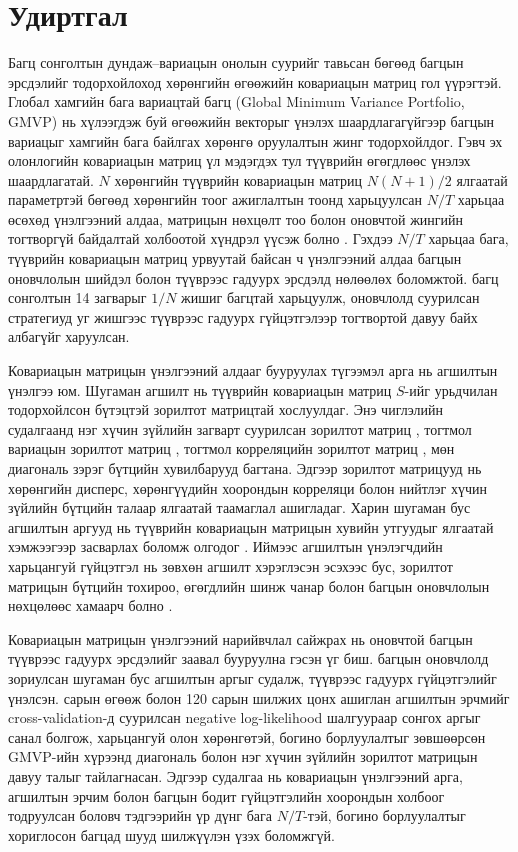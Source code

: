 \section{Удиртгал}
\label{sec:introduction}

Багц сонголтын дундаж--вариацын онолын суурийг \citet{markowitz1952} тавьсан бөгөөд багцын эрсдэлийг тодорхойлоход хөрөнгийн өгөөжийн ковариацын матриц гол үүрэгтэй. Глобал хамгийн бага вариацтай багц (Global Minimum Variance Portfolio, GMVP) нь хүлээгдэж буй өгөөжийн векторыг үнэлэх шаардлагагүйгээр багцын вариацыг хамгийн бага байлгах хөрөнгө оруулалтын жинг тодорхойлдог. Гэвч эх олонлогийн ковариацын матриц үл мэдэгдэх тул түүврийн өгөгдлөөс үнэлэх шаардлагатай. $N$ хөрөнгийн түүврийн ковариацын матриц $N(N+1)/2$ ялгаатай параметртэй бөгөөд хөрөнгийн тоог ажиглалтын тоонд харьцуулсан $N/T$ харьцаа өсөхөд үнэлгээний алдаа, матрицын нөхцөлт тоо болон оновчтой жингийн тогтворгүй байдалтай холбоотой хүндрэл үүсэж болно \citep{ledoitwolf2004a}. Гэхдээ $N/T$ харьцаа бага, түүврийн ковариацын матриц урвуутай байсан ч үнэлгээний алдаа багцын оновчлолын шийдэл болон түүврээс гадуурх эрсдэлд нөлөөлөх боломжтой. \citet{demiguel2009} багц сонголтын 14 загварыг $1/N$ жишиг багцтай харьцуулж, оновчлолд суурилсан стратегиуд уг жишгээс түүврээс гадуурх гүйцэтгэлээр тогтвортой давуу байх албагүйг харуулсан.

Ковариацын матрицын үнэлгээний алдааг бууруулах түгээмэл арга нь агшилтын үнэлгээ юм. Шугаман агшилт нь түүврийн ковариацын матриц $S$-ийг урьдчилан тодорхойлсон бүтэцтэй зорилтот матрицтай хослуулдаг. Энэ чиглэлийн судалгаанд нэг хүчин зүйлийн загварт суурилсан зорилтот матриц \citep{ledoitwolf2003}, тогтмол вариацын зорилтот матриц \citep{ledoitwolf2004a}, тогтмол корреляцийн зорилтот матриц \citep{ledoitwolf2004b}, мөн диагональ зэрэг бүтцийн хувилбарууд \citep{SchaferStrimmer2005,AndoXiao2023} багтана. Эдгээр зорилтот матрицууд нь хөрөнгийн дисперс, хөрөнгүүдийн хоорондын корреляци болон нийтлэг хүчин зүйлийн бүтцийн талаар ялгаатай таамаглал ашигладаг. Харин шугаман бус агшилтын аргууд нь түүврийн ковариацын матрицын хувийн утгуудыг ялгаатай хэмжээгээр засварлах боломж олгодог \citep{ledoitwolf2012,ledoitwolf2020}. Иймээс агшилтын үнэлэгчдийн харьцангуй гүйцэтгэл нь зөвхөн агшилт хэрэглэсэн эсэхээс бус, зорилтот матрицын бүтцийн тохироо, өгөгдлийн шинж чанар болон багцын оновчлолын нөхцөлөөс хамаарч болно \citep{ledoitwolf2022}.

Ковариацын матрицын үнэлгээний нарийвчлал сайжрах нь оновчтой багцын түүврээс гадуурх эрсдэлийг заавал бууруулна гэсэн үг биш. \citet{ledoitwolf2017} багцын оновчлолд зориулсан шугаман бус агшилтын аргыг судалж, түүврээс гадуурх гүйцэтгэлийг үнэлсэн. \citet{shi2025} сарын өгөөж болон 120 сарын шилжих цонх ашиглан агшилтын эрчмийг cross-validation-д суурилсан negative log-likelihood шалгуураар сонгох аргыг санал болгож, харьцангуй олон хөрөнгөтэй, богино борлуулалтыг зөвшөөрсөн GMVP-ийн хүрээнд диагональ болон нэг хүчин зүйлийн зорилтот матрицын давуу талыг тайлагнасан. Эдгээр судалгаа нь ковариацын үнэлгээний арга, агшилтын эрчим болон багцын бодит гүйцэтгэлийн хоорондын холбоог тодруулсан боловч тэдгээрийн үр дүнг бага $N/T$-тэй, богино борлуулалтыг хориглосон багцад шууд шилжүүлэн үзэх боломжгүй.

